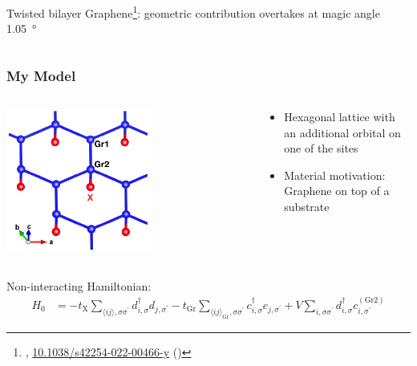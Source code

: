 \documentclass[aspectratio=169]{beamer}
\begin{document}
\begin{frame}
\begin{columns}[T]
\begin{column}{0.5\textwidth}
\begin{center}
				Twisted bilayer Graphene\footnote<2->[frame]{\citeauthor{tormaSuperconductivitySuperfluidityQuantum2022}, \href{https://doi.org/10.1038/s42254-022-00466-y}{10.1038/s42254-022-00466-y} (\citeyear{tormaSuperconductivitySuperfluidityQuantum2022})}: geometric contribution overtakes at magic angle \SI{1.05}{\degree}
			\end{center}
		\end{column}
	\end{columns}
\end{frame}

\begin{frame}
	\frametitle{My Model}
	
	\begin{columns}
		\begin{column}{0.4\textwidth}
			\begin{center}
				\includegraphics[width=0.6\textwidth]{figs/EG-X structure}
			\end{center}
		\end{column}
		\begin{column}{0.6\textwidth}
			\begin{itemize}
				\item Hexagonal lattice with an additional orbital on one of the sites
				\item Material motivation: Graphene on top of a substrate
			\end{itemize}
		\end{column}
	\end{columns}
	
	Non-interacting Hamiltonian:
	\begin{align}
		H_0 &= -t_{\mathrm{X}} \sum_{\langle ij \rangle, \sigma \sigma^{\prime}} d_{i, \sigma}^{\dagger} d_{j, \sigma^{\prime}}
		-t_{\mathrm{Gr}} \sum_{\langle ij \rangle_{\textrm{Gr}}, \sigma \sigma^{\prime}}
		c_{i, \sigma}^{\dagger} c_{j, \sigma^{\prime}}
		+ V \sum_{i, \sigma \sigma^{\prime}}
		d_{i, \sigma}^{\dagger} c_{i, \sigma^{\prime}}^{(\textrm{Gr2})}
	\end{align}
\end{frame}
\end{document}
